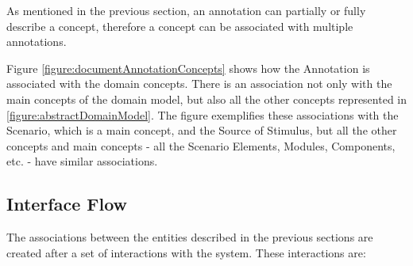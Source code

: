 \documentclass{llncs}
\begin{document}
As mentioned in the previous section, an annotation can partially or fully describe a concept, therefore a concept can be associated with multiple annotations. 

Figure \ref{figure:documentAnnotationConcepts} shows how the Annotation is associated with the domain concepts. There is an association not only with the main concepts of the domain model, but also all the other concepts represented in \ref{figure:abstractDomainModel}. The figure exemplifies these associations with the Scenario, which is a main concept, and the Source of Stimulus, but all the other concepts and main concepts - all the Scenario Elements, Modules, Components, etc. - have similar associations.  

\subsection{Interface Flow}
\label{section:interfaceFlow}

The associations between the entities described in the previous sections are created after a set of interactions with the system. These interactions are:
\end{document}
